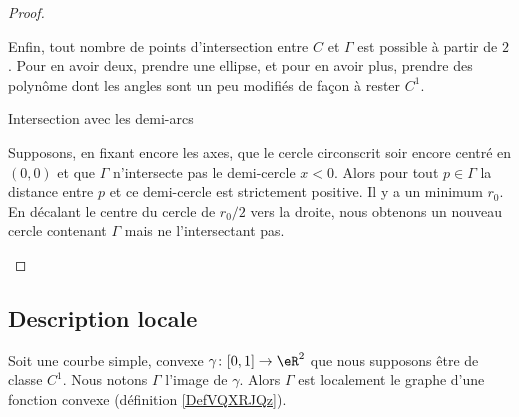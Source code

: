 \begin{proof}
\begin{subproof}
        Enfin, tout nombre de points d'intersection entre \( C\) et \( \Gamma\) est possible à partir de \( 2\). Pour en avoir deux, prendre une ellipse, et pour en avoir plus, prendre des polynôme dont les angles sont un peu modifiés de façon à rester \( C^1\).

    \item[Intersection avec les demi-arcs]

        Supposons, en fixant encore les axes, que le cercle circonscrit soir encore centré en \( (0,0)\) et que \( \Gamma\) n'intersecte pas le demi-cercle \( x<0\). Alors pour tout \( p\in \Gamma\) la distance entre \( p\) et ce demi-cercle est strictement positive. Il y a un minimum \( r_0\). En décalant le centre du cercle de \( r_0/2\) vers la droite, nous obtenons un nouveau cercle contenant \( \Gamma\) mais ne l'intersectant pas.
    \end{subproof}
\end{proof}

\subsection{Description locale}

\begin{lemma}        \label{LEMooGEVEooHxPTMO}
    Soit une courbe simple, convexe \( \gamma\colon \mathopen[ 0 , 1 \mathclose]\to \eR^2\) que nous supposons être de classe \( C^1\). Nous notons \( \Gamma\) l'image de \( \gamma\). Alors \( \Gamma\) est localement le graphe d'une fonction convexe (définition \ref{DefVQXRJQz}).
\end{lemma}

